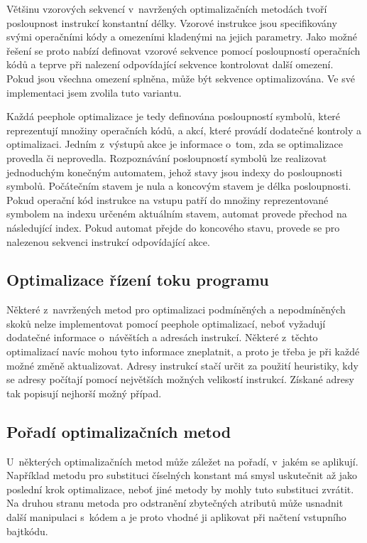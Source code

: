 Většinu vzorových sekvencí v~navržených optimalizačních metodách tvoří posloupnost instrukcí konstantní délky. Vzorové instrukce jsou specifikovány svými operačními kódy a omezeními kladenými na jejich parametry. Jako možné řešení se proto nabízí definovat vzorové sekvence pomocí posloupností operačních kódů a teprve při nalezení odpovídající sekvence kontrolovat další omezení. Pokud jsou všechna omezení splněna, může být sekvence optimalizována. Ve své implementaci jsem zvolila tuto variantu. 

Každá peephole optimalizace je tedy definována posloupností symbolů, které reprezentují množiny operačních kódů, a akcí, které provádí dodatečné kontroly a optimalizaci. Jedním z~výstupů akce je informace o~tom, zda se optimalizace provedla či neprovedla.
Rozpoznávání posloupností symbolů lze realizovat jednoduchým konečným automatem, jehož stavy jsou indexy do posloupnosti symbolů. Počátečním stavem je nula a koncovým stavem je délka posloupnosti. Pokud operační kód instrukce na vstupu patří do množiny reprezentované symbolem na indexu určeném aktuálním stavem, automat provede přechod na následující index. Pokud automat přejde do koncového stavu, provede se pro nalezenou sekvenci instrukcí odpovídající akce.

\subsection{Optimalizace řízení toku programu}\label{Jbyco:Design:Flow}

Některé z~navržených metod pro optimalizaci podmíněných a nepodmíněných skoků nelze implementovat pomocí peephole optimalizací, neboť vyžadují dodatečné informace o~návěštích a adresách instrukcí. Některé z~těchto optimalizací navíc mohou tyto informace zneplatnit, a proto je třeba je při každé možné změně aktualizovat. 
Adresy instrukcí stačí určit za použití heuristiky, kdy se adresy počítají pomocí největších možných velikostí instrukcí. Získané adresy tak popisují nejhorší možný případ.

\subsection{Pořadí optimalizačních metod} \label{Jbyco:Design:Ordering}

U~některých optimalizačních metod může záležet na pořadí, v~jakém se aplikují. Například metodu pro substituci číselných konstant má smysl uskutečnit až jako poslední krok optimalizace, neboť jiné metody by mohly tuto substituci zvrátit. Na druhou stranu metoda pro odstranění zbytečných atributů může usnadnit další manipulaci s~kódem a je proto vhodné ji aplikovat při načtení vstupního bajtkódu. 

